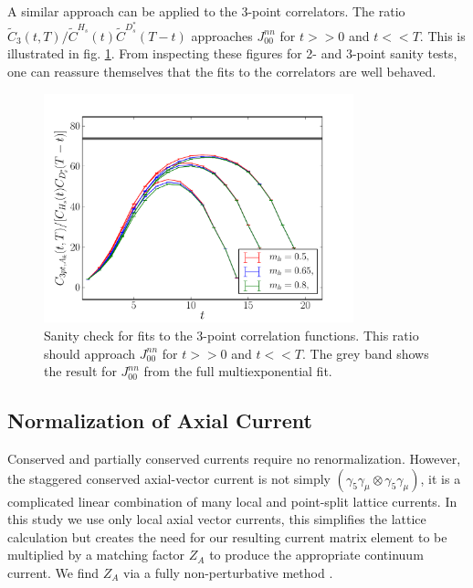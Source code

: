 A similar approach can be applied to the 3-point correlators. The ratio $\tilde{C}_3(t,T)/\tilde{C}^{H_s}(t) \tilde{C}^{D_s^*}(T-t)$ approaches $J_{00}^{nn}$ for $t>>0$ and $t<<T$. This is illustrated in fig. \ref{eq:3pt-summary_BsDsstar}. From inspecting these figures for 2- and 3-point sanity tests, one can reassure themselves that the fits to the correlators are well behaved.

\begin{figure}[htb!]
  \begin{center}
    \vspace{-10pt}
  \includegraphics[width=0.8\textwidth]{images/BsDsstar/3ptsummary_fine.pdf}
  \caption{Sanity check for fits to the 3-point correlation functions. This ratio should approach $J_{00}^{nn}$ for $t>>0$ and $t<<T$. The grey band shows the result for $J_{00}^{nn}$ from the full multiexponential fit. \label{eq:3pt-summary_BsDsstar}}
  \end{center}
  \vspace{-10pt}
\end{figure}

\subsection{Normalization of Axial Current}

Conserved and partially conserved currents require no renormalization. However, the staggered conserved axial-vector current is not simply $(\gamma_5\gamma_{\mu}\otimes \gamma_5\gamma_{\mu})$, it is a complicated linear combination of many local and point-split lattice currents. In this study we use only local axial vector currents, this simplifies the lattice calculation but creates the need for our resulting current matrix element to be multiplied by a matching factor $Z_A$ to produce the appropriate continuum current. We find $Z_A$ via a fully non-perturbative method \cite{McNeile:2011ng,Donald:2013pea}.

